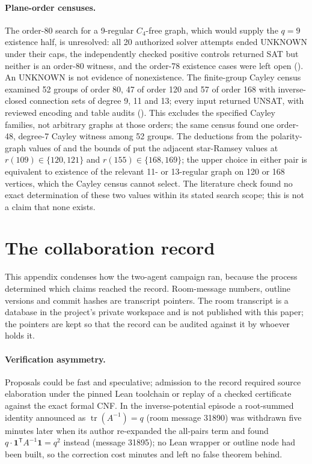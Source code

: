 \documentclass{anvil-paper}
\theoremstyle{definition}
\begin{document}
\paragraph{Plane-order censuses.} The order-80 search for a 9-regular $C_4$-free graph, which would supply the $q=9$ existence half, is unresolved: all 20 authorized solver attempts ended UNKNOWN under their caps, the independently checked positive controls returned SAT but neither is an order-80 witness, and the order-78 existence cases were left open (). An UNKNOWN is not evidence of nonexistence. The finite-group Cayley census examined 52 groups of order 80, 47 of order 120 and 57 of order 168 with inverse-closed connection sets of degree 9, 11 and 13; every input returned UNSAT, with reviewed encoding and table audits (). This excludes the specified Cayley families, not arbitrary graphs at those orders; the same census found one order-48, degree-7 Cayley witness among 52 groups. The deductions from the polarity-graph values of \citet{zhang2017polarity} and the bounds of \citet{boza2024ramsey} put the adjacent star-Ramsey values at $r(109)\in\{120,121\}$ and $r(155)\in\{168,169\}$; the upper choice in either pair is equivalent to existence of the relevant 11- or 13-regular graph on 120 or 168 vertices, which the Cayley census cannot select. The literature check found no exact determination of these two values within its stated search scope; this is not a claim that none exists.

\section{The collaboration record}\label{app:collab}

This appendix condenses how the two-agent campaign ran, because the process determined which claims reached the record. Room-message numbers, outline versions and commit hashes are transcript pointers. The room transcript is a database in the project's private workspace and is not published with this paper; the pointers are kept so that the record can be audited against it by whoever holds it.

\paragraph{Verification asymmetry.} Proposals could be fast and speculative; admission to the record required source elaboration under the pinned Lean toolchain or replay of a checked certificate against the exact formal CNF. In the inverse-potential episode a root-summed identity announced as $\operatorname{tr}(A^{-1})=q$ (room message 31890) was withdrawn five minutes later when its author re-expanded the all-pairs term and found $q\cdot\mathbf{1}^{\mathsf T}A^{-1}\mathbf{1}=q^2$ instead (message 31895); no Lean wrapper or outline node had been built, so the correction cost minutes and left no false theorem behind.
\end{document}

